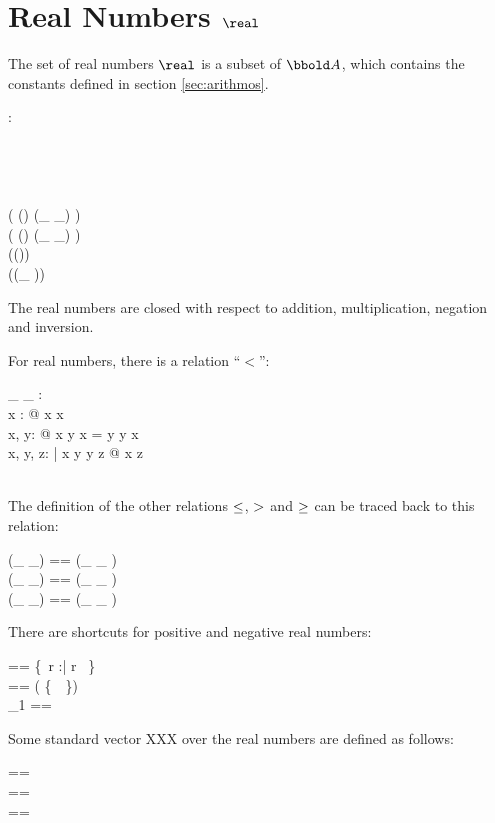 \documentclass[12pt]{article}
\begin{document}
\section{Real Numbers $\real$}
\label{sec:real-numbers}
The set of real numbers $\real$ is a subset of $\arithmos$, which
contains the constants defined in section \ref{sec:arithmos}.
%
\begin{axdef}
  \real : \power \arithmos\\
  \where
  \azero \in \real\\
  \aone \in \real\\
  \atwo \in \real\\
  \aten \in \real\\
  \ran ( (\real \cross \real) \dres (\_ \aplus \_) ) \subset \real\\
  \ran ( (\real \cross \real) \dres (\_ \amult \_) ) \subset \real\\
  \ran (\real \dres (\aneg ))  \subset \real\\
  \ran (\real \dres (\_ \ainv ))  \subset \real\\
\end{axdef}

The real numbers are closed with respect to addition, multiplication,
negation and inversion.

For real numbers, there is a relation ``$<$'':
%
\begin{axdef}
  \_ \alt \_ : \real \rel \real\\
  \where
  \forall x : \real @ \lnot x \alt x\\
  \forall x, y: \real @ x \alt y \lor x = y \lor y \alt x\\
  \forall x, y, z: \real | x \alt y \land y \alt z @ x \alt z \\
  \azero \alt \aone\\
\end{axdef}
%
The definition of the other relations $\leq$, $>$ and $\geq$ can
be traced back to this relation:
%
\begin{zed}
  (\_ \aleq \_) == (\_ \alt \_ ) \cup \id \real \\
  (\_ \agt \_) == (\_ \alt \_ ) \inv \\
  (\_ \ageq \_) == (\_ \agt \_ ) \cup \id \real \\
\end{zed}
%
There are shortcuts for positive and negative real numbers:
%
\begin{zed}
  \realplus == \{~r :\real | r \agt \azero~\}\\
  \realminus == \real \setminus ( \realplus \cup \{~\azero~\})\\
  \real_1 == \realplus \cup \realminus \\
\end{zed}
%
Some standard vector XXX over the real numbers are defined as follows:
\begin{zed}
  \realtwod == \real \cross \real \\
  \realthreed == \realtwod \cross \real \\
  \realfourd == \realthreed \cross \real \\
\end{zed}
\end{document}
